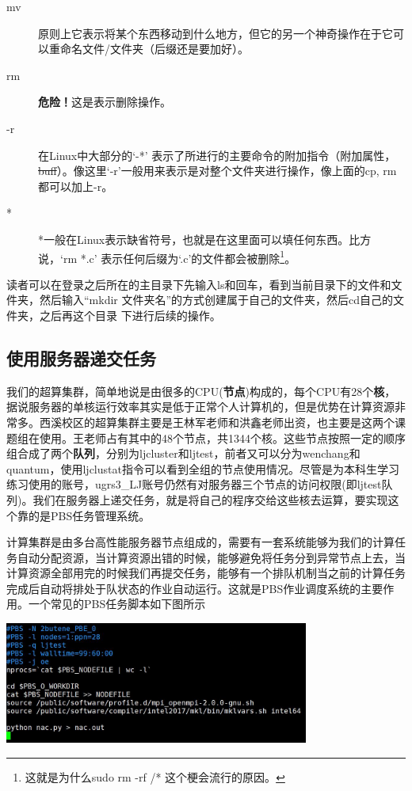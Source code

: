 \documentclass{article}
\numberwithin{equation}{section}
\begin{document}
\begin{description}
    \item[mv] 原则上它表示将某个东西移动到什么地方，但它的另一个神奇操作在于它可以重命名文件/文件夹（后缀还是要加好）。

    \item[rm] \textbf{ 危险！}这是表示删除操作。

    \item[-r] 在Linux中大部分的`-*' 表示了所进行的主要命令的附加指令（附加属性，\sout{buff}）。像这里`-r'一般用来表示是对整个文件夹进行操作，像上面的cp, rm 都可以加上-r。

    \item[*] *一般在Linux表示缺省符号，也就是在这里面可以填任何东西。比方说，`rm *.c' 表示任何后缀为`.c'的文件都会被删除\footnote{这就是为什么sudo rm -rf /* 这个梗会流行的原因。}。

    \end{description}

    读者可以在登录之后所在的主目录下先输入ls和回车，看到当前目录下的文件和文件夹，然后输入“mkdir 文件夹名”的方式创建属于自己的文件夹，然后cd自己的文件夹，之后再这个目录
    下进行后续的操作。
    \subsection{使用服务器递交任务}
    我们的超算集群，简单地说是由很多的CPU(\textbf{节点})构成的，每个CPU有28个\textbf{核}，据说服务器的单核运行效率其实是低于正常个人计算机的，但是优势在计算资源非常多。西溪校区的超算集群主要是王林军老师和洪鑫老师出资，也主要是这两个课题组在使用。王老师占有其中的48个节点，共1344个核。这些节点按照一定的顺序组合成了两个\textbf{队列}，分别为ljcluster和ljtest，前者又可以分为wenchang和quantum，使用ljclustat指令可以看到全组的节点使用情况。尽管是为本科生学习练习使用的账号，ugrs3\_LJ账号仍然有对服务器三个节点的访问权限(即ljtest队列)。我们在服务器上递交任务，就是将自己的程序交给这些核去运算，要实现这个靠的是PBS任务管理系统。
    
    计算集群是由多台高性能服务器节点组成的，需要有一套系统能够为我们的计算任务自动分配资源，当计算资源出错的时候，能够避免将任务分到异常节点上去，当计算资源全部用完的时候我们再提交任务，能够有一个排队机制当之前的计算任务完成后自动将排处于队状态的作业自动运行。这就是PBS作业调度系统的主要作用。一个常见的PBS任务脚本如下图所示
    \begin{center}
      \includegraphics[width=10cm]{fig/PBS.jpg}
    \end{center}
    
\end{document}
